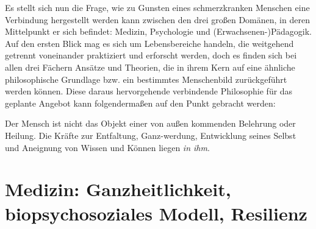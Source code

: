 \documentclass[
  twoside,
  parskip=half-,
  paper=176mm:246mm,
  BCOR=14mm,
  DIV=14,
]{scrreprt}
\makeatletter
\renewenvironment*{displayquote}
  {\begingroup\setlength{\leftmargini}{0pt}\csq@getcargs{\csq@bdquote{}{}}}
  {\csq@edquote\endgroup}
\makeatother
\begin{document}
Es stellt sich nun die Frage, wie zu Gunsten eines schmerzkranken Menschen eine Verbindung hergestellt werden kann zwischen den drei großen Domänen, in deren Mittelpunkt er sich befindet: Medizin, Psychologie und (Erwachsenen-)Pädagogik. Auf den ersten Blick mag es sich um Lebensbereiche handeln, die weitgehend getrennt voneinander praktiziert und erforscht werden, doch es finden sich bei allen drei Fächern Ansätze und Theorien, die in ihrem Kern auf eine ähnliche philosophische Grundlage bzw. ein bestimmtes Menschenbild zurückgeführt werden können. Diese daraus hervorgehende verbindende Philosophie für das geplante Angebot kann folgendermaßen auf den Punkt gebracht werden:

\begin{displayquote}\normalfont
  Der Mensch ist nicht das Objekt einer von außen kommenden Belehrung oder Heilung. Die Kräfte zur Entfaltung, Ganz-werdung, Entwicklung seines Selbst und Aneignung von Wissen und Können liegen \textit{in ihm}.
\end{displayquote}

\section{Medizin: Ganzheitlichkeit, biopsychosoziales Modell, Resilienz} 
\end{document}
